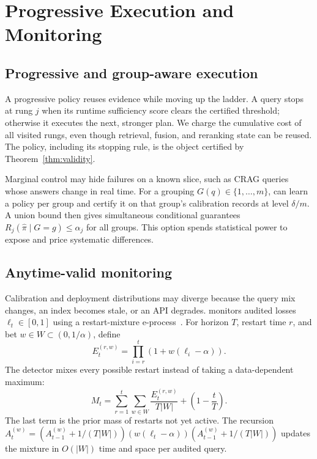\section{Progressive Execution and Monitoring}
\label{sec:runtime}



\subsection{Progressive and group-aware execution}

A progressive policy reuses evidence while moving up the ladder. A query
stops at rung $j$ when its runtime sufficiency score clears the certified
threshold; otherwise it executes the next, stronger plan. We charge the
cumulative cost of all visited rungs, even though retrieval, fusion, and
reranking state can be reused. The policy, including its stopping rule, is
the object certified by Theorem~\ref{thm:validity}.

Marginal control may hide failures on a known slice, such as CRAG queries
whose answers change in real time. For a grouping
$G(q)\in\{1,\ldots,m\}$, \system can learn a policy per group and certify it
on that group's calibration records at level $\delta/m$. A union bound then
gives simultaneous conditional guarantees
$R_j(\hat\pi\mid G=g)\leq\alpha_j$ for all groups. This option spends
statistical power to expose and price systematic differences.

\subsection{Anytime-valid monitoring}
\label{sec:monitor}

Calibration and deployment distributions may diverge because the query
mix changes, an index becomes stale, or an API degrades. \system monitors
audited losses $\ell_t\in[0,1]$ using a restart-mixture
e-process~\cite{ramdas2023savi,shin2024edetectors}. For horizon $T$, restart
time $r$, and bet $w\in W\subset(0,1/\alpha)$, define
\[
E_t^{(r,w)}=\prod_{i=r}^{t}(1+w(\ell_i-\alpha)).
\]
The detector mixes every possible restart instead of taking a
data-dependent maximum:
\begin{equation}
\label{eq:mixdetector}
M_t=\sum_{r=1}^{t}\sum_{w\in W}\frac{E_t^{(r,w)}}{T|W|}
      +\left(1-\frac{t}{T}\right).
\end{equation}
The last term is the prior mass of restarts not yet active. The recursion
$A_t^{(w)}=(A_{t-1}^{(w)}+1/(T|W|))
(w(\ell_t-\alpha))(A_{t-1}^{(w)}+1/(T|W|))$
updates the mixture in $O(|W|)$ time and space per audited query.

